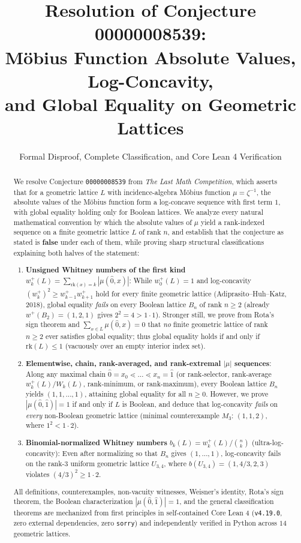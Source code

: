 \documentclass[11pt]{article}
\title{\textbf{Resolution of Conjecture 00000008539:\\
M\"obius Function Absolute Values, Log-Concavity,\\
and Global Equality on Geometric Lattices}}
\author{Formal Disproof, Complete Classification, and Core Lean 4 Verification}
\date{}
\theoremstyle{definition}
\theoremstyle{remark}
\newcommand{\rk}{\mathrm{rk}}
\newcommand{\hatzero}{\hat{0}}
\newcommand{\hatone}{\hat{1}}
\begin{document}
\maketitle

\begin{abstract}
We resolve Conjecture \texttt{00000008539} from \emph{The Last Math Competition}, which asserts that for a geometric lattice $L$ with incidence-algebra M\"obius function $\mu = \zeta^{-1}$, the absolute values of the M\"obius function form a log-concave sequence with first term $1$, with global equality holding only for Boolean lattices. We analyze every natural mathematical convention by which the absolute values of $\mu$ yield a rank-indexed sequence on a finite geometric lattice $L$ of rank $n$, and establish that the conjecture as stated is \textbf{false} under each of them, while proving sharp structural classifications explaining both halves of the statement:
\begin{enumerate}
  \item \textbf{Unsigned Whitney numbers of the first kind} $w_k^+(L) = \sum_{\rk(x)=k} |\mu(\hatzero, x)|$: While $w_0^+(L)=1$ and log-concavity $(w_k^+)^2 \ge w_{k-1}^+ w_{k+1}^+$ hold for every finite geometric lattice (Adiprasito--Huh--Katz, 2018), global equality \emph{fails} on every Boolean lattice $B_n$ of rank $n \ge 2$ (already $w^+(B_2)=(1,2,1)$ gives $2^2 = 4 > 1 \cdot 1$). Stronger still, we prove from Rota's sign theorem and $\sum_{x \in L} \mu(\hatzero,x)=0$ that \emph{no} finite geometric lattice of rank $n \ge 2$ ever satisfies global equality; thus global equality holds if and only if $\rk(L) \le 1$ (vacuously over an empty interior index set).
  \item \textbf{Elementwise, chain, rank-averaged, and rank-extremal $|\mu|$ sequences}: Along any maximal chain $\hatzero = x_0 \lessdot \dots \lessdot x_n = \hatone$ (or rank-selector, rank-average $w_k^+(L)/W_k(L)$, rank-minimum, or rank-maximum), every Boolean lattice $B_n$ yields $(1,1,\dots,1)$, attaining global equality for all $n \ge 0$. However, we prove $|\mu(\hatzero,\hatone)| = 1$ if and only if $L$ is Boolean, and deduce that log-concavity \emph{fails} on \emph{every} non-Boolean geometric lattice (minimal counterexample $M_3$: $(1,1,2)$, where $1^2 < 1 \cdot 2$).
  \item \textbf{Binomial-normalized Whitney numbers} $b_k(L) = w_k^+(L)/\binom{n}{k}$ (ultra-log-concavity): Even after normalizing so that $B_n$ gives $(1,\dots,1)$, log-concavity fails on the rank-$3$ uniform geometric lattice $U_{3,4}$, where $b(U_{3,4})=(1, 4/3, 2, 3)$ violates $(4/3)^2 \ge 1 \cdot 2$.
\end{enumerate}
All definitions, counterexamples, non-vacuity witnesses, Weisner's identity, Rota's sign theorem, the Boolean characterization $|\mu(\hatzero,\hatone)|=1$, and the general classification theorems are mechanized from first principles in self-contained Core Lean 4 (\texttt{v4.19.0}, zero external dependencies, zero \texttt{sorry}) and independently verified in Python across $14$ geometric lattices.
\end{abstract}
\end{document}
